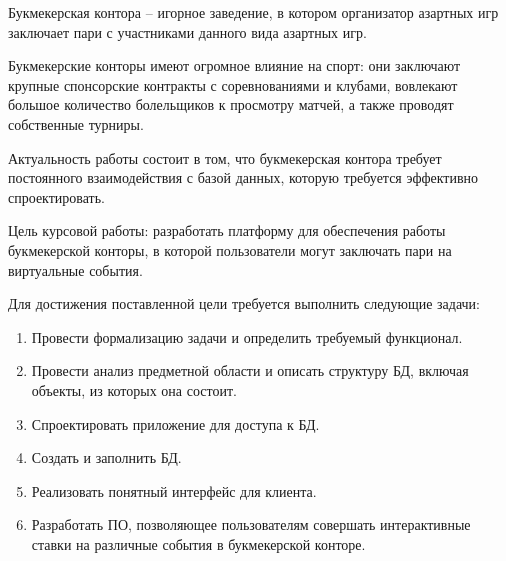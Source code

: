Букмекерская контора -- игорное заведение, в котором организатор азартных игр заключает пари с участниками данного вида азартных игр. 

Букмекерские конторы имеют огромное влияние на спорт: они заключают крупные спонсорские контракты с соревнованиями и клубами, вовлекают большое количество болельщиков к просмотру матчей, а также проводят собственные турниры. 

Актуальность работы состоит в том, что букмекерская контора требует постоянного взаимодействия с базой данных, которую требуется эффективно спроектировать.

Цель курсовой работы: разработать платформу для обеспечения работы букмекерской конторы, в которой пользователи могут заключать пари на виртуальные события.

Для достижения поставленной цели требуется выполнить следующие задачи:
\begin{enumerate}
	\item Провести формализацию задачи и определить требуемый функционал.
	\item Провести анализ предметной области и описать структуру БД, включая объекты, из которых она состоит.
	\item Спроектировать приложение для доступа к БД.
	\item Создать и заполнить БД.
	\item Реализовать понятный интерфейс для клиента.
	\item Разработать ПО, позволяющее пользователям совершать интерактивные ставки на различные события в букмекерской конторе.
\end{enumerate} 
